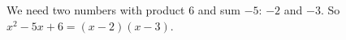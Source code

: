 We need two numbers with product $6$ and sum $-5$: $-2$ and $-3$. So $x^2-5x+6=\boxed{(x-2)(x-3)}$.
